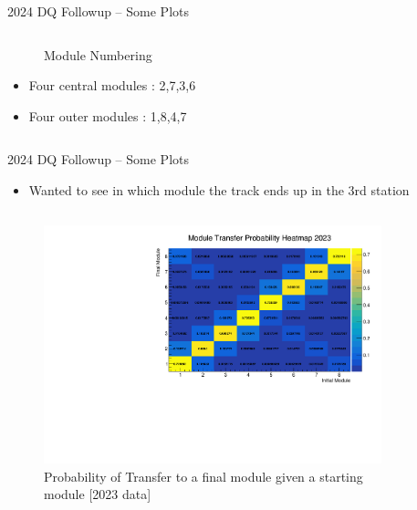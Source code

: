 \begin{frame}{2024 DQ Followup -- Some Plots}
\begin{columns}
\begin{column}{0.6 \textwidth}
\begin{figure}
            \caption{Module Numbering}
        \end{figure}
        \begin{itemize}
            \scriptsize
            \item Four central modules : 2,7,3,6
            \item Four outer modules : 1,8,4,7
        \end{itemize}
    \end{column}
\end{columns}
\end{frame}

\begin{frame}{2024 DQ Followup -- Some Plots}
    \begin{itemize}
        \small
        \item Wanted to see in which module the track ends up in the 3rd station
    \end{itemize}
    \begin{columns}
        \begin{column}{0.5\linewidth}
            \begin{figure}
                \includegraphics[width=\linewidth]{assets/st0_module_number vs st1_module_number_prob_2023.pdf}
                \caption{Probability of Transfer to a final module given a starting module [2023 data]}
            \end{figure}
        \end{column}
        \begin{column}{0.5\linewidth}
            \begin{figure}

\end{figure}
\end{column}
\end{columns}
\end{frame}
